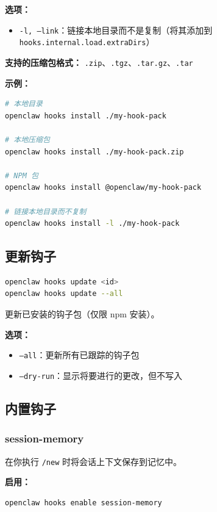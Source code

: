 \textbf{选项：}

\begin{itemize}
  \item \texttt{-l, --link}：链接本地目录而不是复制（将其添加到 \texttt{hooks.internal.load.extraDirs}）
\end{itemize}


\textbf{支持的压缩包格式：} \texttt{.zip}、\texttt{.tgz}、\texttt{.tar.gz}、\texttt{.tar}

\textbf{示例：}

\begin{lstlisting}[language=bash]
# 本地目录
openclaw hooks install ./my-hook-pack

# 本地压缩包
openclaw hooks install ./my-hook-pack.zip

# NPM 包
openclaw hooks install @openclaw/my-hook-pack

# 链接本地目录而不复制
openclaw hooks install -l ./my-hook-pack
\end{lstlisting}


\subsection{更新钩子}


\begin{lstlisting}[language=bash]
openclaw hooks update <id>
openclaw hooks update --all
\end{lstlisting}


更新已安装的钩子包（仅限 npm 安装）。

\textbf{选项：}

\begin{itemize}
  \item \texttt{--all}：更新所有已跟踪的钩子包
  \item \texttt{--dry-run}：显示将要进行的更改，但不写入
\end{itemize}


\subsection{内置钩子}


\subsubsection{session-memory}


在你执行 \texttt{/new} 时将会话上下文保存到记忆中。

\textbf{启用：}

\begin{lstlisting}[language=bash]
openclaw hooks enable session-memory
\end{lstlisting}


